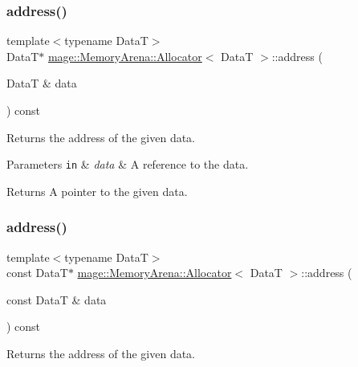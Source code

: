 \subsubsection{\texorpdfstring{address()}{address()}\hspace{0.1cm}{\footnotesize\ttfamily [1/2]}}
{\footnotesize\ttfamily template$<$typename DataT$>$ \\
DataT$\ast$ \hyperlink{structmage_1_1_memory_arena_1_1_allocator}{mage\+::\+Memory\+Arena\+::\+Allocator}$<$ DataT $>$\+::address (\begin{DoxyParamCaption}\item[{DataT \&}]{data }\end{DoxyParamCaption}) const\hspace{0.3cm}{\ttfamily [noexcept]}}

Returns the address of the given data.


\begin{DoxyParams}[1]{Parameters}
\mbox{\tt in}  & {\em data} & A reference to the data. \\
\hline
\end{DoxyParams}
\begin{DoxyReturn}{Returns}
A pointer to the given data. 
\end{DoxyReturn}
\hypertarget{structmage_1_1_memory_arena_1_1_allocator_a823bf66f6693fc85b2ccb146e1c0ba58}{}\label{structmage_1_1_memory_arena_1_1_allocator_a823bf66f6693fc85b2ccb146e1c0ba58} 
\subsubsection{\texorpdfstring{address()}{address()}\hspace{0.1cm}{\footnotesize\ttfamily [2/2]}}
{\footnotesize\ttfamily template$<$typename DataT$>$ \\
const DataT$\ast$ \hyperlink{structmage_1_1_memory_arena_1_1_allocator}{mage\+::\+Memory\+Arena\+::\+Allocator}$<$ DataT $>$\+::address (\begin{DoxyParamCaption}\item[{const DataT \&}]{data }\end{DoxyParamCaption}) const\hspace{0.3cm}{\ttfamily [noexcept]}}

Returns the address of the given data.


